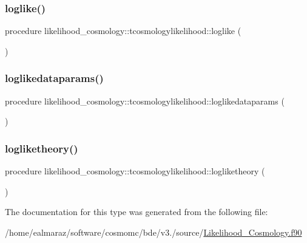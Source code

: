 \subsubsection{\texorpdfstring{loglike()}{loglike()}}
{\footnotesize\ttfamily procedure likelihood\+\_\+cosmology\+::tcosmologylikelihood\+::loglike (\begin{DoxyParamCaption}{ }\end{DoxyParamCaption})\hspace{0.3cm}{\ttfamily [private]}}

\mbox{\label{structlikelihood__cosmology_1_1tcosmologylikelihood_a2aa259d5cdecea1809292604236c9b48}} 
\subsubsection{\texorpdfstring{loglikedataparams()}{loglikedataparams()}}
{\footnotesize\ttfamily procedure likelihood\+\_\+cosmology\+::tcosmologylikelihood\+::loglikedataparams (\begin{DoxyParamCaption}{ }\end{DoxyParamCaption})\hspace{0.3cm}{\ttfamily [private]}}

\mbox{\label{structlikelihood__cosmology_1_1tcosmologylikelihood_abb60a06bbb8c7f15c15534cb4e1bfb29}} 
\subsubsection{\texorpdfstring{logliketheory()}{logliketheory()}}
{\footnotesize\ttfamily procedure likelihood\+\_\+cosmology\+::tcosmologylikelihood\+::logliketheory (\begin{DoxyParamCaption}{ }\end{DoxyParamCaption})\hspace{0.3cm}{\ttfamily [private]}}



The documentation for this type was generated from the following file\+:\begin{DoxyCompactItemize}
\item 
/home/ealmaraz/software/cosmomc/bde/v3./source/\mbox{\hyperlink{Likelihood__Cosmology_8f90}{Likelihood\+\_\+\+Cosmology.\+f90}}\end{DoxyCompactItemize}
